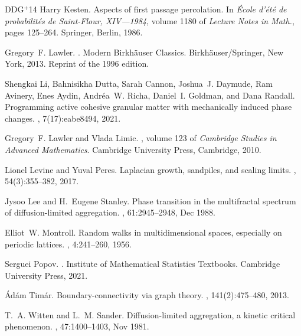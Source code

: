 \documentclass[11pt,reqno]{amsart}
\theoremstyle{definition}
\numberwithin{equation}{section}
\newcommand{\1}{\mathbf{1}}
\newcommand{\etalchar}[1]{$^{#1}$}
\begin{document}
\begin{thebibliography}{DDG{\etalchar{+}}14}
Harry Kesten.
\newblock Aspects of first passage percolation.
\newblock In {\em \'{E}cole d'\'{e}t\'{e} de probabilit\'{e}s de
  {S}aint-{F}lour, {XIV}---1984}, volume 1180 of {\em Lecture Notes in Math.},
  pages 125--264. Springer, Berlin, 1986.

Gregory~F. Lawler.
.
\newblock Modern Birkh\"{a}user Classics. Birkh\"{a}user/Springer, New York,
  2013.
\newblock Reprint of the 1996 edition.

\bibitem[LDC{\etalchar{+}}21]{li2021}
Shengkai Li, Bahnisikha Dutta, Sarah Cannon, Joshua~J. Daymude, Ram Avinery,
  Enes Aydin, Andr{\'e}a~W. Richa, Daniel~I. Goldman, and Dana Randall.
\newblock Programming active cohesive granular matter with mechanically induced
  phase changes.
, 7(17):eabe8494, 2021.

Gregory~F. Lawler and Vlada Limic.
, volume 123 of {\em
  Cambridge Studies in Advanced Mathematics}.
\newblock Cambridge University Press, Cambridge, 2010.

Lionel Levine and Yuval Peres.
\newblock Laplacian growth, sandpiles, and scaling limits.
, 54(3):355--382, 2017.

Jysoo Lee and H.~Eugene Stanley.
\newblock Phase transition in the multifractal spectrum of diffusion-limited
  aggregation.
, 61:2945--2948, Dec 1988.

Elliot~W. Montroll.
\newblock Random walks in multidimensional spaces, especially on periodic
  lattices.
, 4:241--260, 1956.

Serguei Popov.
.
\newblock Institute of Mathematical Statistics Textbooks. Cambridge University
  Press, 2021.

\'{A}d\'{a}m Tim\'{a}r.
\newblock Boundary-connectivity via graph theory.
, 141(2):475--480, 2013.

T.~A. Witten and L.~M. Sander.
\newblock Diffusion-limited aggregation, a kinetic critical phenomenon.
, 47:1400--1403, Nov 1981.

\end{thebibliography}
\end{document}
